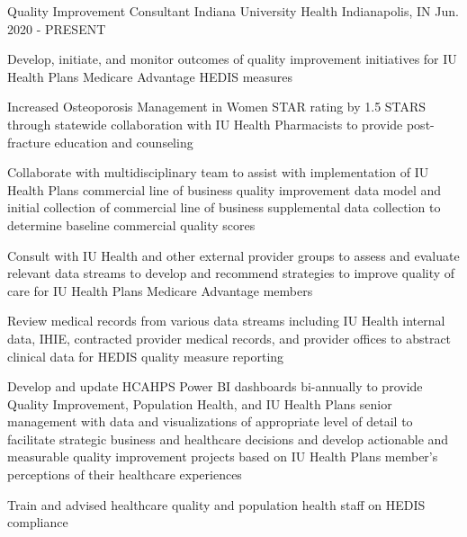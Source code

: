

\begin{cventries}


  \cventry
    {Quality Improvement Consultant} %
    {Indiana University Health} %
    {Indianapolis, IN} %
    {Jun. 2020 - PRESENT} %
    {
      \begin{cvitems} %
        \item {Develop, initiate, and monitor outcomes of quality improvement initiatives for IU Health Plans Medicare Advantage HEDIS measures}
        \item {Increased Osteoporosis Management in Women STAR rating by 1.5 STARS through statewide collaboration with IU Health Pharmacists to provide post-fracture education and counseling}
        \item {Collaborate with multidisciplinary team to assist with implementation of IU Health Plans commercial line of business quality improvement data model and initial collection of commercial line of business supplemental data collection to determine baseline commercial quality scores}
        \item {Consult with IU Health and other external provider groups to assess and evaluate relevant data streams to develop and recommend strategies to improve quality of care for IU Health Plans Medicare Advantage members}
        \item {Review medical records from various data streams including IU Health internal data, IHIE, contracted provider medical records, and provider offices to abstract clinical data for HEDIS quality measure reporting}
        \item {Develop and update HCAHPS Power BI dashboards bi-annually to provide Quality Improvement, Population Health, and IU Health Plans senior management with data and visualizations of appropriate level of detail to facilitate strategic business and healthcare decisions and develop actionable and measurable quality improvement projects based on IU Health Plans member's perceptions of their healthcare experiences}
        \item {Train and advised healthcare quality and population health staff on HEDIS compliance}
  \end{cvitems}
    }



\end{cventries}
